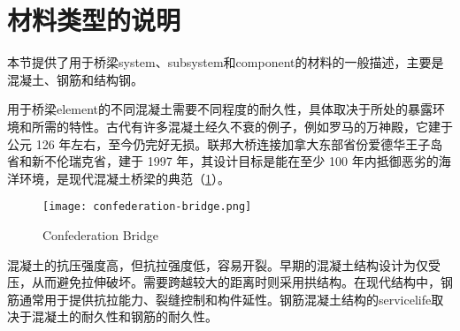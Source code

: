 \section{材料类型的说明}
\label{sec:material-types}

本节提供了用于桥梁\gls*{system}、\gls*{subsystem}和\gls*{component}的材料的一般描述，主要是混凝土、钢筋和结构钢。

用于桥梁\gls*{element}的不同混凝土需要不同程度的耐久性，具体取决于所处的暴露环境和所需的特性。古代有许多混凝土经久不衰的例子，例如罗马的万神殿，它建于公元 126 年左右，至今仍完好无损。联邦大桥连接加拿大东部省份爱德华王子岛省和新不伦瑞克省，建于 1997 年，其设计目标是能在至少 100 年内抵御恶劣的海洋环境，是现代混凝土桥梁的典范（\cref{fig:confederation-bridge}）。

\begin{figure}
  \texttt{[image: confederation-bridge.png]}
  \caption{Confederation Bridge}\label{fig:confederation-bridge}
\end{figure}

混凝土的抗压强度高，但抗拉强度低，容易开裂。早期的混凝土结构设计为仅受压，从而避免拉伸破坏。需要跨越较大的距离时则采用拱结构。在现代结构中，钢筋通常用于提供抗拉能力、裂缝控制和构件延性。钢筋混凝土结构的\gls*{servicelife}取决于混凝土的耐久性和钢筋的耐久性。

